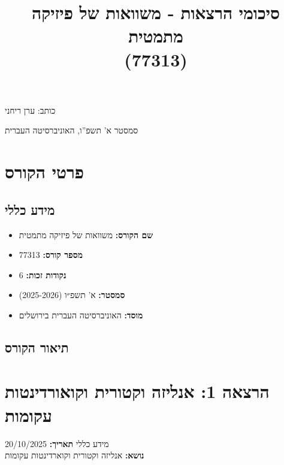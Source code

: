 \documentclass{article}
\begin{document}
\title{סיכומי הרצאות - משוואות של פיזיקה מתמטית \\ (77313)}
\maketitle
\begin{center}
כותב: ערן ריחני
\par\end{center}

\begin{center}
סמסטר א' תשפ\textquotedblright ו, האוניברסיטה העברית

\centering 


\par\end{center}
\newpage{}

\tableofcontents

\newpage{}

\section*{פרטי הקורס}

\subsection*{מידע כללי}
\begin{itemize}
    \item \textbf{שם הקורס:} משוואות של פיזיקה מתמטית 
    \item \textbf{מספר קורס:} 77313
    \item \textbf{נקודות זכות:} 6
    \item \textbf{סמסטר:} א' תשפ״ו (2025-2026)
    \item \textbf{מוסד:} האוניברסיטה העברית בירושלים
\end{itemize}



\subsection*{תיאור הקורס}

\newpage{}

\section{הרצאה 1: אנליזה וקטורית וקואורדינטות עקומות}

\begin{mainbox}{מידע כללי}
\textbf{תאריך:} 20/10/2025\\
\textbf{נושא:}  אנליזה וקטורית וקוארדינטות עקומות
\end{mainbox}
\end{document}
